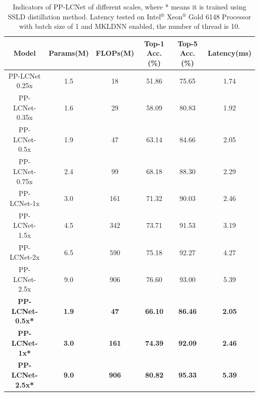 \documentclass[final]{cvpr}
\begin{document}
\begin{table}[!htbp]
\centering
\begin{center}
\begin{tabular}{c|c|c|c|c|c}
\toprule[1pt]
Model & Params(M) & FLOPs(M) & Top-1 Acc.(\%) & Top-5 Acc.(\%) & Latency(ms) \\
\midrule[1pt]
PP-LCNet 0.25x     & 1.5     & 18     & 51.86	 & 75.65 & 1.74 \\
PP-LCNet-0.35x     &  1.6    & 29     & 58.09	 & 80.83 & 1.92 \\
PP-LCNet-0.5x     & 1.9     & 47    & 63.14	 & 84.66 & 2.05 \\
PP-LCNet-0.75x     & 2.4     & 99     & 68.18	 & 88.30 & 2.29 \\
PP-LCNet-1x     & 3.0     &161     & 71.32	 & 90.03 & 2.46 \\
PP-LCNet-1.5x     & 4.5     & 342     & 73.71	 & 91.53 & 3.19 \\
PP-LCNet-2x     & 6.5     & 590     & 75.18	 & 92.27 & 4.27 \\
PP-LCNet-2.5x     & 9.0     & 906     & 76.60	 & 93.00 & 5.39 \\
\hline
\textbf{PP-LCNet-0.5x*}     & \textbf{1.9}     & \textbf{47}    & \textbf{66.10}	 & \textbf{86.46} & \textbf{2.05} \\
\textbf{PP-LCNet-1x*}     & \textbf{3.0}     &\textbf{161}     & \textbf{74.39}	 & \textbf{92.09} & \textbf{2.46} \\
\textbf{PP-LCNet-2.5x*}     & \textbf{9.0}     & \textbf{906}     & \textbf{80.82}	 & \textbf{95.33} & \textbf{5.39} \\
\bottomrule[1pt]
\end{tabular}
\end{center}

\caption{Indicators of PP-LCNet of different scales, where * means it is trained using SSLD\cite{cui2021beyond} distillation method. Latency tested on Intel$^\circledR$ Xeon$^\circledR$ Gold 6148 Processor with batch size of 1 and  MKLDNN enabled, the number of thread is 10.}
\label{tab-acc-of-PP-LCNet}
\end{table}
\end{document}
